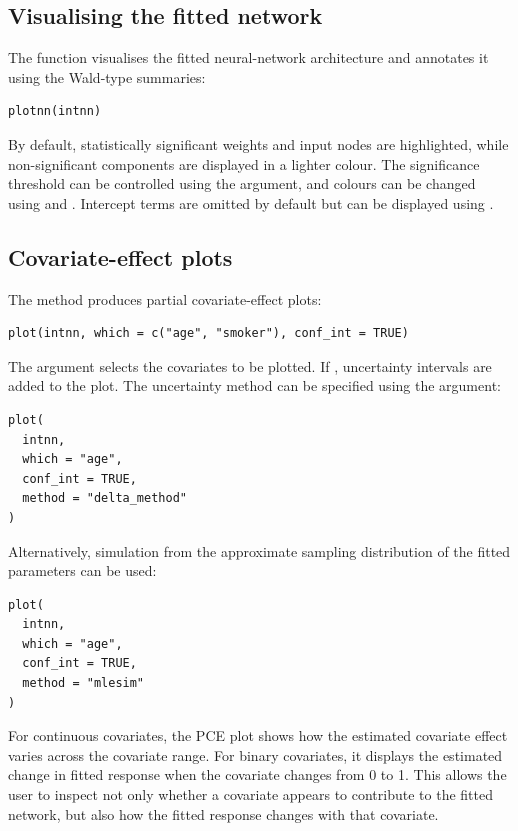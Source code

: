 \subsection{Visualising the fitted network}\label{visualising-the-fitted-network}

The  function visualises the fitted neural-network architecture and annotates it using the Wald-type summaries:

\begin{verbatim}
plotnn(intnn)
\end{verbatim}

By default, statistically significant weights and input nodes are highlighted, while non-significant components are displayed in a lighter colour.
The significance threshold can be controlled using the  argument, and colours can be changed using  and .
Intercept terms are omitted by default but can be displayed using .

\subsection{Covariate-effect plots}\label{covariate-effect-plots}

The  method produces partial covariate-effect plots:

\begin{verbatim}
plot(intnn, which = c("age", "smoker"), conf_int = TRUE)
\end{verbatim}

The argument  selects the covariates to be plotted.
If , uncertainty intervals are added to the plot.
The uncertainty method can be specified using the  argument:

\begin{verbatim}
plot(
  intnn,
  which = "age",
  conf_int = TRUE,
  method = "delta_method"
)
\end{verbatim}

Alternatively, simulation from the approximate sampling distribution of the fitted parameters can be used:

\begin{verbatim}
plot(
  intnn,
  which = "age",
  conf_int = TRUE,
  method = "mlesim"
)
\end{verbatim}

For continuous covariates, the PCE plot shows how the estimated covariate effect varies across the covariate range.
For binary covariates, it displays the estimated change in fitted response when the covariate changes from 0 to 1.
This allows the user to inspect not only whether a covariate appears to contribute to the fitted network, but also how the fitted response changes with that covariate.


